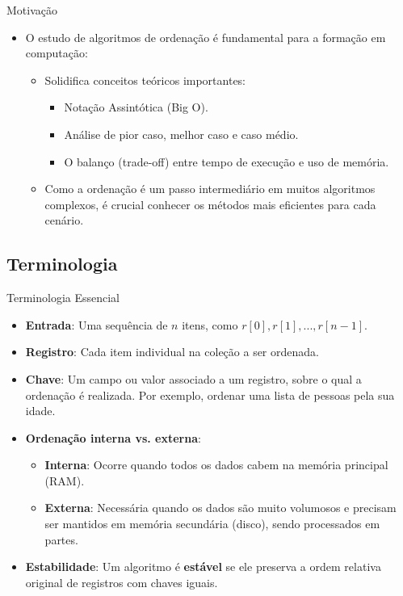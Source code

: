 \documentclass{beamer}
\begin{document}
\begin{frame}{Motivação}
\begin{itemize}
 \item O estudo de algoritmos de ordenação é fundamental para a formação em computação:
\begin{itemize}
 \item Solidifica conceitos teóricos importantes:
 \begin{itemize}
  \item Notação Assintótica (Big O).
  \item Análise de pior caso, melhor caso e caso médio.
  \item O balanço (trade-off) entre tempo de execução e uso de memória.
 \end{itemize}
 \item Como a ordenação é um passo intermediário em muitos algoritmos complexos, é crucial conhecer os métodos mais eficientes para cada cenário.
\end{itemize}
\end{itemize}
\end{frame}

\subsection{Terminologia}
\begin{frame}{Terminologia Essencial}
\begin{itemize}
 \item \textbf{Entrada}: Uma sequência de $n$ itens, como $r[0], r[1], ..., r[n-1]$.
 \item \textbf{Registro}: Cada item individual na coleção a ser ordenada.
 \item \textbf{Chave}: Um campo ou valor associado a um registro, sobre o qual a ordenação é realizada. Por exemplo, ordenar uma lista de pessoas pela sua idade.
 \item \textbf{Ordenação interna vs. externa}:
    \begin{itemize}
        \item \textbf{Interna}: Ocorre quando todos os dados cabem na memória principal (RAM).
        \item \textbf{Externa}: Necessária quando os dados são muito volumosos e precisam ser mantidos em memória secundária (disco), sendo processados em partes.
    \end{itemize}
 \item \textbf{Estabilidade}: Um algoritmo é \textbf{estável} se ele preserva a ordem relativa original de registros com chaves iguais.
\end{itemize}
\end{frame}
\end{document}
